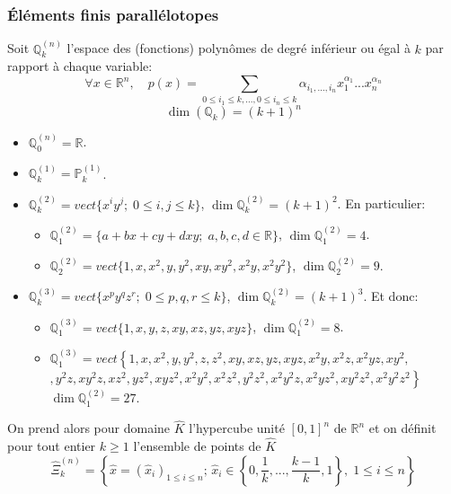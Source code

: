 \documentclass{beamer}
\begin{document}
\begin{frame}
\frametitle{Éléments finis parallélotopes}
Soit $\mathbb{Q}_k^{(n)}$ l'espace des (fonctions) polynômes de degré inférieur ou égal à $k$ par rapport à chaque variable: 
\begin{equation}
\forall x\in \mathbb{R}^n,\quad p(x)=\sum_{0\leq i_1\leq k,...,0\leq i_n\leq k}\alpha_{i_1,...,i_n}x_1^{\alpha_1}...x_n^{\alpha_n}
\end{equation}
\[\dim (\mathbb{Q}_k) = (k+ 1)^n\]


\begin{itemize}
\item $\mathbb{Q}_0^{(n)}=\mathbb{R}$.
\item $\mathbb{Q}_k^{(1)}=\mathbb{P}_k^{(1)}$.
\item $\mathbb{Q}_k^{(2)}=vect\{x^iy^j;\; 0\leq i,j \leq k\}$, $\dim \mathbb{Q}_k^{(2)}=(k+1)^2$.
En particulier: 
\begin{itemize}
\item $\mathbb{Q}_1^{(2)}=\{a+bx+cy+dxy;\; a,b,c,d\in \mathbb{R}\}$, $\dim \mathbb{Q}_1^{(2)}=4$.
\item $\mathbb{Q}_2^{(2)}=vect\{1,x,x^2,y,y^2,xy,xy^2,x^2y,x^2y^2\}$, $\dim \mathbb{Q}_2^{(2)}=9$.
\end{itemize}
\item $\mathbb{Q}_k^{(3)}=vect\{x^py^qz^r;\; 0\leq p,q,r \leq k\}$, $\dim \mathbb{Q}_k^{(2)}=(k+1)^3$.
Et donc: 
\begin{itemize}
\item $\mathbb{Q}_1^{(3)}=vect\{1,x,y,z,xy,xz,yz,xyz\}$, $\dim \mathbb{Q}_1^{(2)}=8$.
\item $\mathbb{Q}_1^{(3)}=vect\left\{
1,x,x^2,y,y^2,z,z^2,xy,xz,yz,xyz,x^2y,x^2z,x^2yz,xy^2,\right.$
$\left. ,y^2z,xy^2z,xz^2,yz^2,xyz^2,x^2y^2,x^2z^2,y^2z^2,x^2y^2z,x^2yz^2,xy^2z^2,x^2y^2z^2\right\}$
$\dim \mathbb{Q}_1^{(2)}=27$.
\end{itemize}
\end{itemize}

   On prend alors pour domaine $\widehat{K}$ l'hypercube unité $[0, 1]^n$ de $\mathbb{R}^n$ et on définit pour tout entier $k \geq 1$ l'ensemble de points de $\widehat{K}$
\begin{equation}
\widehat{\Xi}_k^{(n)}=\left\{\hat{x}=(\hat{x}_i)_{1\leq i\leq n};\, \hat{x}_i\in\left\{0,\frac 1k,...,\frac{k-1}{k},1\right\},\; 1\leq i\leq n\right\}
\end{equation}
\end{frame}
\end{document}
